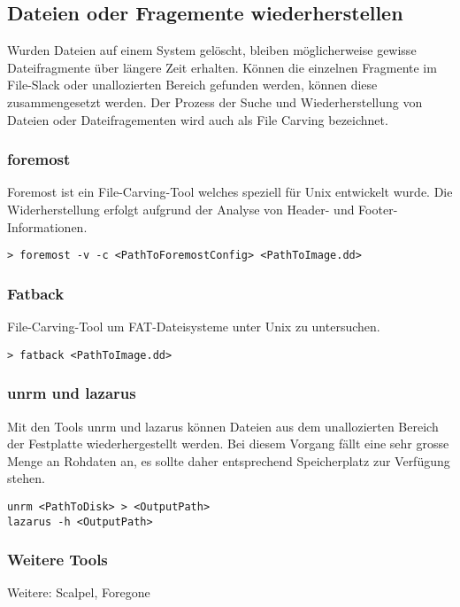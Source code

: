 

\subsection{Dateien oder Fragemente wiederherstellen}
Wurden Dateien auf einem System gelöscht, bleiben möglicherweise gewisse Dateifragmente über längere Zeit erhalten. Können die einzelnen Fragmente im File-Slack oder unallozierten Bereich gefunden werden, können diese zusammengesetzt werden. Der Prozess der Suche und Wiederherstellung von Dateien oder Dateifragementen wird auch als File Carving bezeichnet.

\subsubsection{foremost}
Foremost ist ein File-Carving-Tool welches speziell für Unix entwickelt wurde. Die Widerherstellung erfolgt aufgrund der Analyse von Header- und Footer-Informationen.

\begin{lstlisting}
> foremost -v -c <PathToForemostConfig> <PathToImage.dd>
\end{lstlisting}


\subsubsection{Fatback}
File-Carving-Tool um FAT-Dateisysteme unter Unix zu untersuchen.

\begin{lstlisting}
> fatback <PathToImage.dd>
\end{lstlisting}


\subsubsection{unrm und lazarus}
Mit den Tools unrm und lazarus können Dateien aus dem unallozierten Bereich der Festplatte wiederhergestellt werden. Bei diesem Vorgang fällt eine sehr grosse Menge an Rohdaten an, es sollte daher entsprechend Speicherplatz zur Verfügung stehen.
\begin{lstlisting}
unrm <PathToDisk> > <OutputPath>
lazarus -h <OutputPath>
\end{lstlisting}


\subsubsection{Weitere Tools} 
Weitere: Scalpel, Foregone



